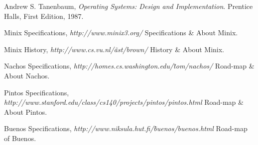 \begin{thebibliography}{9}

  Andrew S. Tanenbaum,
  \emph{Operating Systems: Design and Implementation}.
  Prentice Halls,
  First Edition,
  1987.

  Minix Specifications,
  \emph{http://www.minix3.org/}
  Specifications \& About Minix.

  Minix History,
  \emph{http://www.cs.vu.nl/\~ast/brown/}
  History \& About Minix.

  Nachos Specifications,
  \emph{http://homes.cs.washington.edu/\~tom/nachos/}
  Road-map \& About Nachos.

  Pintos Specifications,
  \emph{http://www.stanford.edu/class/cs140/projects/pintos/pintos.html}
  Road-map \& About Pintos.

  Buenos Specifications,
  \emph{http://www.niksula.hut.fi/\~buenos/buenos.html}
  Road-map of Buenos.

\end{thebibliography}


